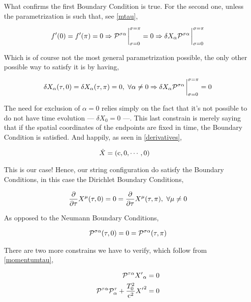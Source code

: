 What confirms the first Boundary Condition is true. For the second one, unless the parametrization is such that, see \ref{mtau},

\begin{align*}
    f'\qty(0)=f'\qty(\pi)=0\Rightarrow\mathcal P^{\sigma\alpha}\eval_{\sigma=0}^{\sigma=\pi}=0\Rightarrow \delta X_\alpha\mathcal P^{\sigma\alpha}\eval_{\sigma=0}^{\sigma=\pi}
\end{align*}

Which is of course not the most general parametrization possible, the only other possible way to satisfy it is by having,

\begin{align*}
    \delta X_\alpha\qty(\tau,0)=\delta X_\alpha\qty(\tau,\pi)=0,\ \forall\alpha\neq0\Rightarrow\delta X_\alpha\mathcal P^{\sigma\alpha}\eval_{\sigma=0}^{\sigma=\pi}=0
\end{align*}

The need for exclusion of $\alpha=0$ relies simply on the fact that it's not possible to do not have time evolution --- $\delta X_0=0$ ---. This last 
constrain is merely saying that if the spatial coordinates of the endpoints are fixed in time, the Boundary Condition is satisfied. And happily, as seen in \ref{derivatives},

\begin{align*}
    \dot X&=\qty(\textnormal{c},0,\cdots,0)
\end{align*}

This is our case! Hence, our string configuration do satisfy the Boundary Conditions, in this case the Dirichlet Boundary Conditions,

\begin{align*}
    \pdv{\tau}X^\mu\qty(\tau,0)=0=\pdv{\tau}X^\mu\qty(\tau,\pi),\ \forall\mu\neq 0
\end{align*}

As opposed to the Neumann Boundary Conditions,

\begin{align*}
    \mathcal P^{\sigma\alpha}\qty(\tau,0)=0=\mathcal P^{\sigma\alpha}\qty(\tau,\pi)
\end{align*}

There are two more constrains we have to verify, which follow from \ref{momentumtau},

\begin{align*}
    \mathcal P^{\tau\alpha}{X'}_\alpha&=0\\
    \mathcal P^{\tau\alpha}\mathcal P^{\tau}_\alpha+\frac{T_0^2}{\textnormal{c}^2}{X'}^2&=0
\end{align*}

